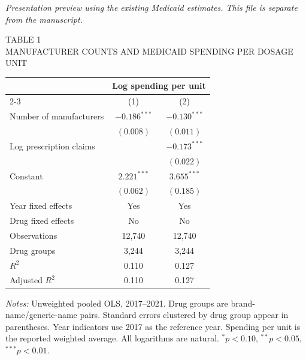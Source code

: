\documentclass[12pt,letterpaper]{article}
\begin{document}
{\footnotesize\itshape
Presentation preview using the existing Medicaid estimates.
This file is separate from the manuscript.}

\vspace{1.2em}

\begin{center}
{\small TABLE 1}\\[4pt]
{\footnotesize\MakeUppercase{Manufacturer Counts and Medicaid Spending per Dosage Unit}}\\[9pt]

\begin{minipage}{0.95\linewidth}
\small
\centering
\begin{tabular*}{\linewidth}{@{\extracolsep{\fill}}lcc@{}}
\toprule
 & \multicolumn{2}{c}{Log spending per unit} \\
\cmidrule(l){2-3}
 & (1) & (2) \\
\midrule
Number of manufacturers & $-0.186^{***}$ & $-0.130^{***}$ \\
 & $(0.008)$ & $(0.011)$ \\
\addlinespace[5pt]
Log prescription claims & & $-0.173^{***}$ \\
 & & $(0.022)$ \\
\addlinespace[5pt]
Constant & $2.221^{***}$ & $3.655^{***}$ \\
 & $(0.062)$ & $(0.185)$ \\
\midrule
Year fixed effects & Yes & Yes \\
Drug fixed effects & No & No \\
Observations & 12,740 & 12,740 \\
Drug groups & 3,244 & 3,244 \\
$R^2$ & 0.110 & 0.127 \\
Adjusted $R^2$ & 0.110 & 0.127 \\
\bottomrule
\end{tabular*}

\vspace{5pt}
{\footnotesize\raggedright
\textit{Notes:} Unweighted pooled OLS, 2017--2021. Drug groups are
brand-name/generic-name pairs. Standard errors clustered by drug group
appear in parentheses. Year indicators use 2017 as the reference year.
Spending per unit is the reported weighted average. All logarithms are
natural. $^{*}p<0.10$, $^{**}p<0.05$, $^{***}p<0.01$.
\par}
\end{minipage}
\end{center}

\vspace{1em}
\end{document}
